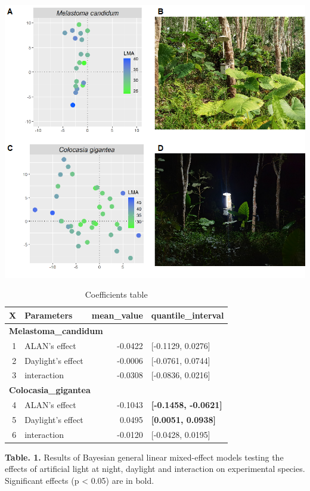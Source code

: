 \documentclass[
  letterpaper,
  DIV=11,
  numbers=noendperiod]{scrartcl}
\begin{document}
\includegraphics{../figs/merge.png}

\newpage

\begin{table}

\caption{Coefficients table}
\centering
\begin{tabular}[t]{r|l|r|>{}l}
\hline
X & Parameters & mean\_value & quantile\_interval\\
\hline
\multicolumn{4}{l}{\textbf{Melastoma\_candidum}}\\
\hline
\hspace{1em}1 & ALAN's effect & -0.0422 & [-0.1129, 0.0276]\\
\hline
\hspace{1em}2 & Daylight's effect & -0.0006 & [-0.0761, 0.0744]\\
\hline
\hspace{1em}3 & interaction & -0.0308 & [-0.0836, 0.0216]\\
\hline
\multicolumn{4}{l}{\textbf{Colocasia\_gigantea}}\\
\hline
\hspace{1em}4 & ALAN's effect & -0.1043 & \textbf{[-0.1458, -0.0621]}\\
\hline
\hspace{1em}5 & Daylight's effect & 0.0495 & \textbf{[0.0051, 0.0938]}\\
\hline
\hspace{1em}6 & interaction & -0.0120 & [-0.0428, 0.0195]\\
\hline
\end{tabular}
\end{table}

\textbf{Table. 1.} Results of Bayesian general linear mixed-effect
models testing the effects of artificial light at night, daylight and
interaction on experimental species. Significant effects (p \textless{}
0.05) are in bold.

\newpage
\end{document}

